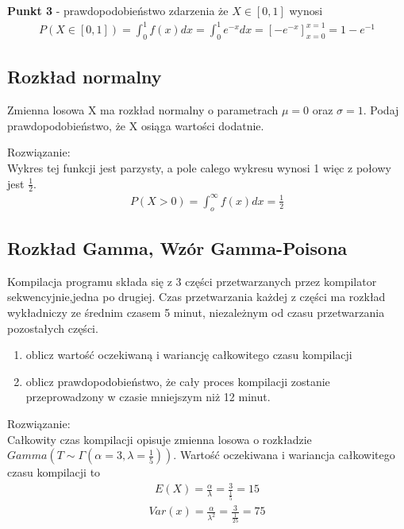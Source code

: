 \documentclass[main.tex]{subfiles}
\begin{document}
    \textbf{Punkt 3} - prawdopodobieństwo zdarzenia że $X \in [0,1]$ wynosi
    \begin{align*}
        P(X \in [0,1]) = \int_0^1 f(x) dx = \int_0^1 e^{-x} dx = [-e^{-x}]_{x=0}^{x=1} = 1 - e^{-1}
    \end{align*}


    \subsection{Rozkład normalny}
    \begin{exercise}
        Zmienna losowa X ma rozkład normalny o parametrach $\mu = 0$ oraz $\sigma = 1$. Podaj prawdopodobieństwo, że
        X osiąga wartości dodatnie.
    \end{exercise}
    Rozwiązanie:\\

    Wykres tej funkcji jest parzysty, a pole calego wykresu wynosi 1 więc z połowy jest $\frac{1}{2}$.
    \begin{align*}
        P(X > 0) =  \int_o^{\infty} f(x)dx = \frac{1}{2}
    \end{align*}

    \subsection{Rozkład Gamma, Wzór Gamma-Poisona}
    \begin{exercise}
        Kompilacja programu składa się z 3 części przetwarzanych przez kompilator sekwencyjnie,jedna po drugiej.
        Czas przetwarzania każdej z części ma rozkład wykładniczy ze średnim czasem 5 minut, niezależnym od
        czasu przetwarzania pozostałych części.
        \begin{enumerate}
            \item oblicz wartość oczekiwaną i wariancję całkowitego czasu kompilacji
            \item oblicz prawdopodobieństwo, że cały proces kompilacji zostanie przeprowadzony w
            czasie mniejszym niż 12 minut.
        \end{enumerate}
    \end{exercise}
    Rozwiązanie:\\

    Całkowity czas kompilacji opisuje zmienna losowa o rozkładzie $Gamma(T \sim \Gamma(\alpha = 3, \lambda = \frac{1}{5}))$.
    Wartość oczekiwana i wariancja całkowitego czasu kompilacji to
    \begin{align*}
        E(X) = \frac{\alpha}{\lambda} = \frac{3}{\frac{1}{5}} = 15
    \end{align*}
    \begin{align*}
        Var(x) = \frac{\alpha}{\lambda^2} = \frac{3}{\frac{1}{25}}= 75
    \end{align*}
\end{document}
